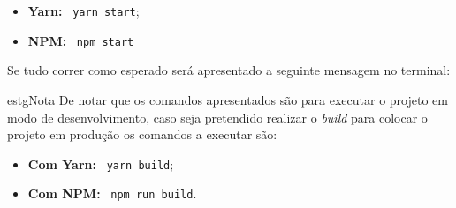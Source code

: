\begin{itemize}
	\item \textbf{Yarn:} ~\texttt{yarn start};
	\item \textbf{NPM:} ~\texttt{npm start}
\end{itemize}

Se tudo correr como esperado será apresentado a seguinte mensagem no terminal:


\begin{mybox}{estg}{Nota}
	De notar que os comandos apresentados são para executar o projeto em modo de desenvolvimento, caso seja pretendido realizar o \textit{build} para colocar o projeto em produção os comandos a executar são:

	\begin{itemize}
		\item \textbf{Com Yarn:} ~\texttt{yarn build};
		\item \textbf{Com NPM:} ~\texttt{npm run build}.
	\end{itemize}
\end{mybox}